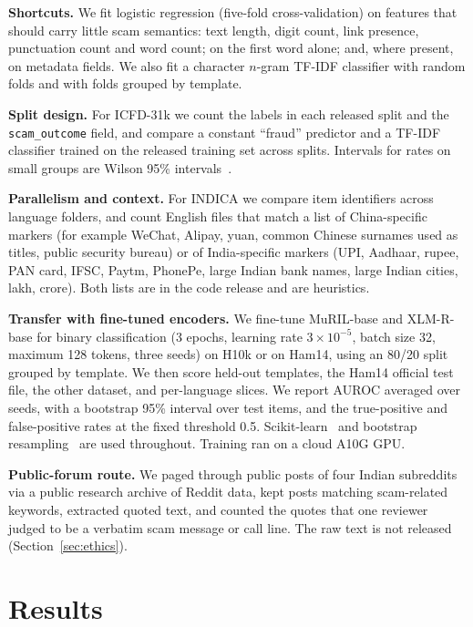 \documentclass[conference]{IEEEtran}
\begin{document}
\textbf{Shortcuts.} We fit logistic regression (five-fold cross-validation) on features that should carry little scam semantics: text length, digit count, link presence, punctuation count and word count; on the first word alone; and, where present, on metadata fields. We also fit a character $n$-gram TF-IDF classifier with random folds and with folds grouped by template.

\textbf{Split design.} For ICFD-31k we count the labels in each released split and the \texttt{scam\_outcome} field, and compare a constant ``fraud'' predictor and a TF-IDF classifier trained on the released training set across splits. Intervals for rates on small groups are Wilson 95\% intervals~\cite{wilson1927}.

\textbf{Parallelism and context.} For INDICA we compare item identifiers across language folders, and count English files that match a list of China-specific markers (for example WeChat, Alipay, yuan, common Chinese surnames used as titles, public security bureau) or of India-specific markers (UPI, Aadhaar, rupee, PAN card, IFSC, Paytm, PhonePe, large Indian bank names, large Indian cities, lakh, crore). Both lists are in the code release and are heuristics.

\textbf{Transfer with fine-tuned encoders.} We fine-tune MuRIL-base and XLM-R-base for binary classification (3 epochs, learning rate $3\times10^{-5}$, batch size 32, maximum 128 tokens, three seeds) on H10k or on Ham14, using an 80/20 split grouped by template. We then score held-out templates, the Ham14 official test file, the other dataset, and per-language slices. We report AUROC averaged over seeds, with a bootstrap 95\% interval over test items, and the true-positive and false-positive rates at the fixed threshold 0.5. Scikit-learn~\cite{pedregosa2011sklearn} and bootstrap resampling~\cite{efron1979bootstrap} are used throughout. Training ran on a cloud A10G GPU.

\textbf{Public-forum route.} We paged through public posts of four Indian subreddits via a public research archive of Reddit data, kept posts matching scam-related keywords, extracted quoted text, and counted the quotes that one reviewer judged to be a verbatim scam message or call line. The raw text is not released (Section~\ref{sec:ethics}).

\section{Results}
\label{sec:results}
\end{document}
